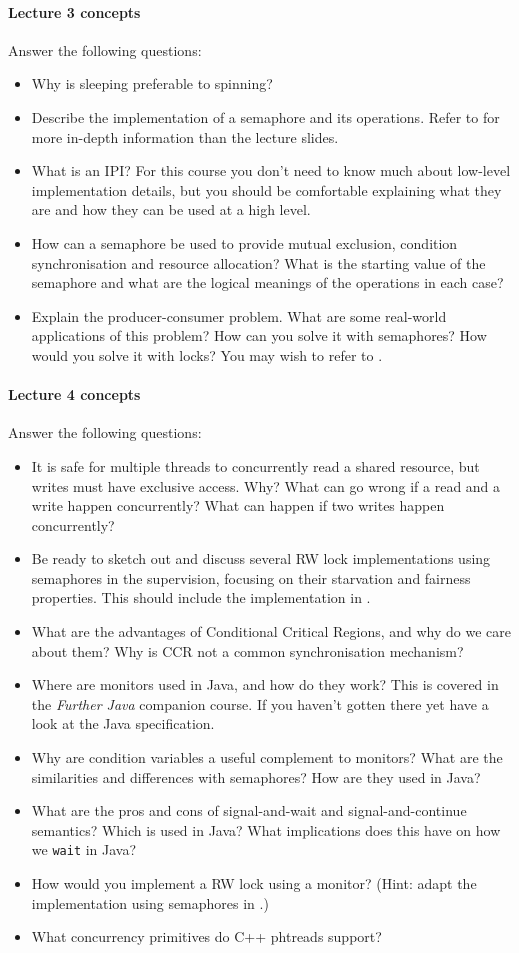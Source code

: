 \documentclass[12pt,a4paper,oneside,openright]{report}
\newcommand{\question}[2]{\paragraph{#1} #2}
\begin{document}
\question{Lecture 3 concepts}{Answer the following questions:
  \begin{itemize}
  \item Why is sleeping preferable to spinning?
  \item Describe the implementation of a semaphore and its
    operations. Refer to
    \cite[Chapters~10.4--10.6]{bacon2003operating} for more in-depth
    information than the lecture slides.
  \item What is an IPI? For this course you don't need to know much
    about low-level implementation details, but you should be
    comfortable explaining what they are and how they can be used at a
    high level.
  \item How can a semaphore be used to provide mutual exclusion,
    condition synchronisation and resource allocation? What is the
    starting value of the semaphore and what are the logical meanings
    of the operations in each case?
  \item Explain the producer-consumer problem. What are some
    real-world applications of this problem? How can you solve it with
    semaphores? How would you solve it with locks? You may wish to
    refer to \cite[Chapter~11.3]{bacon2003operating}.
  \end{itemize}
}

\question{Lecture 4 concepts}{Answer the following questions:
  \begin{itemize}
  \item It is safe for multiple threads to concurrently read a shared
    resource, but writes must have exclusive access. Why?  What can go
    wrong if a read and a write happen concurrently?  What can happen
    if two writes happen concurrently?
  \item Be ready to sketch out and discuss several RW lock
    implementations using semaphores in the supervision, focusing on
    their starvation and fairness properties. This should include the
    implementation in \cite[Chapter~11.5]{bacon2003operating}.
  \item What are the advantages of Conditional Critical Regions, and
    why do we care about them? Why is CCR not a common synchronisation
    mechanism?
  \item Where are monitors used in Java, and how do they work? This is
    covered in the \emph{Further Java} companion course. If you
    haven't gotten there yet have a look at the Java specification.
  \item Why are condition variables a useful complement to monitors?
    What are the similarities and differences with semaphores? How are
    they used in Java?
  \item What are the pros and cons of signal-and-wait and
    signal-and-continue semantics? Which is used in Java? What
    implications does this have on how we \texttt{wait} in Java?
  \item How would you implement a RW lock using a monitor? (Hint:
    adapt the implementation using semaphores in
    \cite[Chapter~11.5]{bacon2003operating}.)
  \item What concurrency primitives do C++ phtreads support?
  \end{itemize}
}
\end{document}
